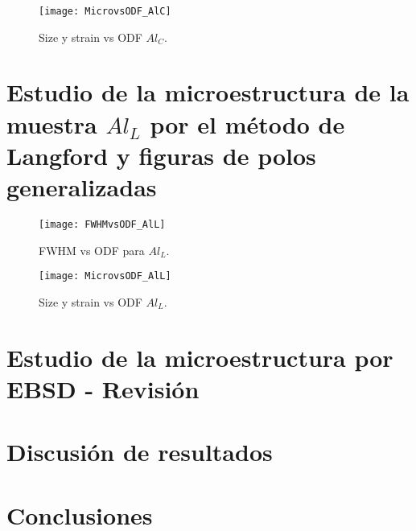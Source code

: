\begin{figure}[!htb]
  \centering
  \texttt{[image: MicrovsODF\_AlC]}
  \caption{Size y strain vs ODF $Al_C$.}
  \label{fig:AlCMicro}
\end{figure}

\newpage
\section{Estudio de la microestructura de la muestra $Al_L$ por el método de Langford y figuras de polos generalizadas}\label{S:AlLLANG}
\begin{figure}[!htb]
  \centering
  \texttt{[image: FWHMvsODF\_AlL]}
  \caption{FWHM vs ODF para $Al_L$.}
  \label{fig:AlLFWHMODF}
\end{figure}

\begin{figure}[!htb]
  \centering
  \texttt{[image: MicrovsODF\_AlL]}
  \caption{Size y strain vs ODF $Al_L$.}
  \label{fig:AlLMicro}
\end{figure}

\newpage
\section{Estudio de la microestructura por EBSD - Revisión}\label{S:AlEBSD}
\section{Discusión de resultados}\label{S:AlDis}
\section{Conclusiones}\label{S:AlConclusiones}

